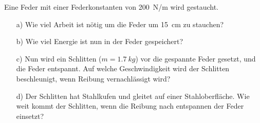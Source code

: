 
\begin{aufgabe}
	Eine Feder mit einer Federkonstanten von \SI{200}{N/m} wird gestaucht.
	\begin{itemize}
		\item [a)] Wie viel Arbeit ist nötig um die Feder um \SI{15}{cm} zu stauchen?
		\item [b)] Wie viel Energie ist nun in der Feder gespeichert?
		\item [c)] Nun wird ein Schlitten ($m=\SI{1.7}{kg}$) vor die gespannte Feder gesetzt, und die Feder entspannt.
			Auf welche Geschwindigkeit wird der Schlitten beschleunigt, wenn Reibung vernachlässigt wird?
		\item [d)] Der Schlitten hat Stahlkufen und gleitet auf einer Stahloberfläche. Wie weit kommt der Schlitten, wenn
			die Reibung nach entspannen der Feder einsetzt?
	\end{itemize}



\end{aufgabe}
